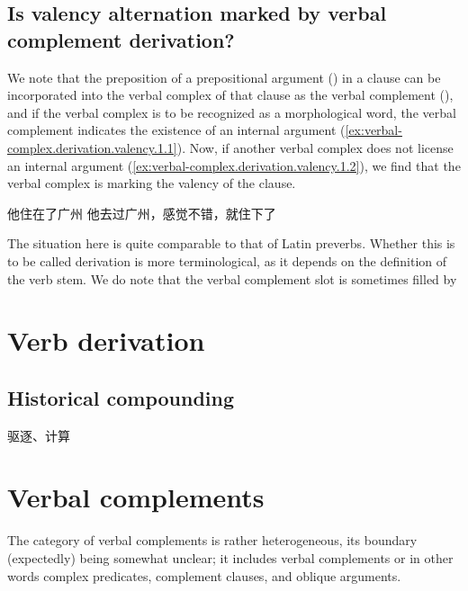 \documentclass[UTF8, a4paper, oneside, scheme=plain, 12pt]{ctexrep}
\begin{document}
\subsection{Is valency alternation marked by verbal complement derivation?}\label{sec:verbal-complex.derivation.valency}

We note that the preposition of a prepositional argument  
() in a clause
can be incorporated into the verbal complex of that clause
as the verbal complement (),
and if the verbal complex is to be recognized as a morphological word,
the verbal complement indicates the existence of an internal argument
(\ref{ex:verbal-complex.derivation.valency.1.1}).
Now, if another verbal complex does not license an internal argument 
(\ref{ex:verbal-complex.derivation.valency.1.2}),
we find that the verbal complex is marking the valency of the clause.

\begin{exe}
    \ex\label{ex:verbal-complex.derivation.valency.1} \begin{xlist}
        \ex\label{ex:verbal-complex.derivation.valency.1.1} 他住在了广州
        \ex\label{ex:verbal-complex.derivation.valency.1.2} 他去过广州，感觉不错，就住下了
    \end{xlist}
\end{exe}

The situation here is quite comparable to that of Latin preverbs.
Whether this is to be called derivation is more terminological,
as it depends on the definition of the verb stem.
We do note that the verbal complement slot is sometimes filled by 


\section{Verb derivation}

\subsection{Historical compounding}\label{sec:verbal-complex.derivation.compound}

驱逐、计算


\section{Verbal complements}\label{sec:verbal-complex.complement}

The category of verbal complements is rather heterogeneous,
its boundary (expectedly) being somewhat unclear;
it includes verbal complements or in other words complex predicates, 
complement clauses, 
and oblique arguments. 
\end{document}
